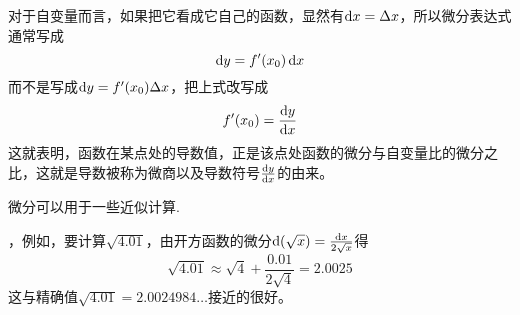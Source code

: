 对于自变量而言，如果把它看成它自己的函数，显然有$\mathop{}\!\mathrm{d} x = \Delta x$，所以微分表达式通常写成
\[ \mathop{}\!\mathrm{d} y = f'(x_0) \mathop{}\!\mathrm{d} x \]
而不是写成$\mathop{}\!\mathrm{d} y = f'(x_0) \Delta x$，把上式改写成
\[ f'(x_0) = \frac{\mathop{}\!\mathrm{d} y}{\mathop{}\!\mathrm{d} x} \]
这就表明，函数在某点处的导数值，正是该点处函数的微分与自变量比的微分之比，这就是导数被称为微商以及导数符号$\frac{\mathop{}\!\mathrm{d} y}{\mathop{}\!\mathrm{d} x}$的由来。

微分可以用于一些近似计算.

\begin{example}
  ，例如，要计算$\sqrt{4.01}$，由开方函数的微分$\mathop{}\!\mathrm{d} (\sqrt{x})=\frac{\mathop{}\!\mathrm{d} x}{2 \sqrt{x}}$得
  \[ \sqrt{4.01} \approx \sqrt{4} + \frac{0.01}{2 \sqrt{4}} = 2.0025 \]
  这与精确值$\sqrt{4.01}=2.0024984\ldots$接近的很好。
\end{example}



